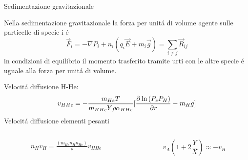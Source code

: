 \begin{frame}{Sedimentazione gravitazionale}

Nella sedimentazione gravitazionale la forza per unit\'a di volume agente sulle particelle di specie i \'e
\begin{equation}
\vec{F}_i=-\nabla P_i+n_i(q_i\vec{E}+m_i\vec{g})=\sum_{i\neq j}\vec{R}_{ij}
\end{equation}
in condizioni di equilibrio il momento trasferito tramite urti con le altre specie \'e uguale alla forza per unit\'a di volume.

Velocit\'a diffusione H-He:
\begin{equation}
v_{HHe}=-\frac{m_{He}T}{m_{HHe}Y\rho \alpha_{HHe}}[\PDy{r}{\ln{(P_eP_H)}}-m_Hg]
\end{equation}
Velocit\'a diffusione elementi pesanti
\begin{columns}
\begin{column}{0.6\textwidth}
\begin{align}
n_Hv_H=\frac{(m_{He}n_Hn_{He})}{\rho}v_{HHe}
\end{align}
\end{column}
\begin{column}{0.4\textwidth}
\begin{equation}
v_A(1+2\frac{Y}{X})\approx-v_H
\end{equation}
\end{column}
\end{columns}


\end{frame}
